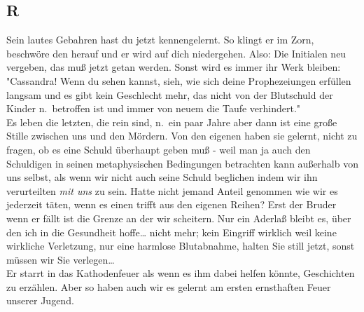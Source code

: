 \documentclass[
]{article}
\author{}
\date{\vspace{-2.5em}}
\begin{document}
\subsection{R}\label{r}

Sein lautes Gebahren hast du jetzt kennengelernt. So klingt er im Zorn,
beschwöre den herauf und er wird auf dich niedergehen. Also: Die
Initialen neu vergeben, das muß jetzt getan werden. Sonst wird es immer
ihr Werk bleiben: "Cassandra! Wenn du sehen kannst, sieh, wie sich deine
Prophezeiungen erfüllen langsam und es gibt kein Geschlecht mehr, das
nicht von der Blutschuld der Kinder n.~betroffen ist und immer von neuem
die Taufe verhindert."\\
Es leben die letzten, die rein sind, n.~ein paar Jahre aber dann ist
eine große Stille zwischen uns und den Mördern. Von den eigenen haben
sie gelernt, nicht zu fragen, ob es eine Schuld überhaupt geben muß -
weil man ja auch den Schuldigen in seinen metaphysischen Bedingungen
betrachten kann außerhalb von uns selbst, als wenn wir nicht auch seine
Schuld beglichen indem wir ihn verurteilten \emph{mit uns} zu sein.
Hatte nicht jemand Anteil genommen wie wir es jederzeit täten, wenn es
einen trifft aus den eigenen Reihen? Erst der Bruder wenn er fällt ist
die Grenze an der wir scheitern. Nur ein Aderlaß bleibt es, über den ich
in die Gesundheit hoffe\ldots{} nicht mehr; kein Eingriff wirklich weil
keine wirkliche Verletzung, nur eine harmlose Blutabnahme, halten Sie
still jetzt, sonst müssen wir Sie verlegen\ldots{}\\
Er starrt in das Kathodenfeuer als wenn es ihm dabei helfen könnte,
Geschichten zu erzählen. Aber so haben auch wir es gelernt am ersten
ernsthaften Feuer unserer Jugend.
\end{document}
